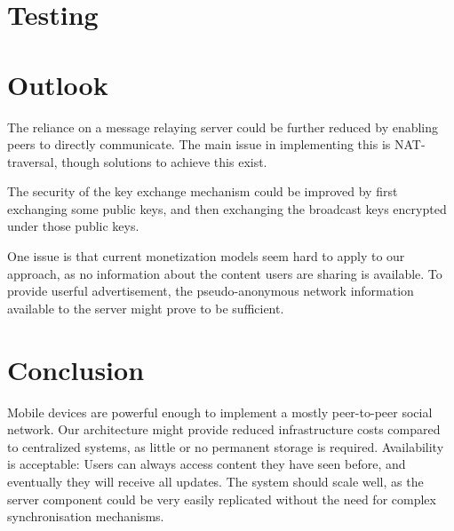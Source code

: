 \documentclass{report}
\begin{document}
\section{Testing}


\section{Outlook}

The reliance on a message relaying server could be further reduced by enabling peers to directly communicate. The main issue in implementing this is NAT-traversal, though solutions to achieve this exist.

The security of the key exchange mechanism could be improved by first exchanging some public keys, and then exchanging the broadcast keys encrypted under those public keys.

One issue is that current monetization models seem hard to apply to our approach, as no information about the content users are sharing is available. To provide userful advertisement, the pseudo-anonymous network information available to the server might prove to be sufficient. 

\section{Conclusion}

Mobile devices are powerful enough to implement a mostly peer-to-peer social network. Our architecture might provide reduced infrastructure costs compared to centralized systems, as little or no permanent storage is required. Availability is acceptable: Users can always access content they have seen before, and eventually they will receive all updates. 
The system should scale well, as the server component could be very easily replicated without the need for complex synchronisation mechanisms.






\end{document}
